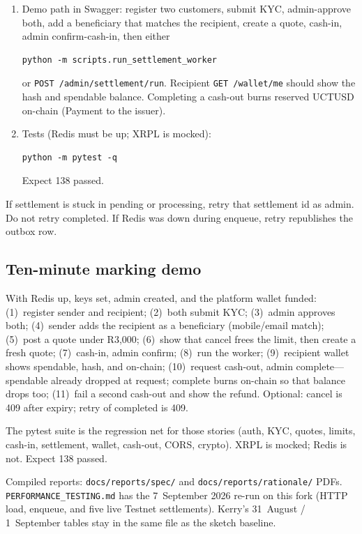 \documentclass[11pt]{article}
\begin{document}
\begin{enumerate}
  \item Demo path in Swagger: register two customers, submit KYC, admin-approve both, add a beneficiary that matches the recipient, create a quote, cash-in, admin confirm-cash-in, then either
\begin{verbatim}
python -m scripts.run_settlement_worker
\end{verbatim}
  or \texttt{POST /admin/settlement/run}. Recipient \texttt{GET /wallet/me} should show the hash and spendable balance. Completing a cash-out burns reserved UCTUSD on-chain (Payment to the issuer).
  \item Tests (Redis must be up; XRPL is mocked):
\begin{verbatim}
python -m pytest -q
\end{verbatim}
  Expect 138 passed.
\end{enumerate}

If settlement is stuck in pending or processing, retry that settlement id as admin. Do not retry completed. If Redis was down during enqueue, retry republishes the outbox row.

\subsection{Ten-minute marking demo}
With Redis up, keys set, admin created, and the platform wallet funded: (1)~register sender and recipient; (2)~both submit KYC; (3)~admin approves both; (4)~sender adds the recipient as a beneficiary (mobile/email match); (5)~post a quote under R3{,}000; (6)~show that cancel frees the limit, then create a fresh quote; (7)~cash-in, admin confirm; (8)~run the worker; (9)~recipient wallet shows spendable, hash, and on-chain; (10)~request cash-out, admin complete---spendable already dropped at request; complete burns on-chain so that balance drops too; (11)~fail a second cash-out and show the refund. Optional: cancel is 409 after expiry; retry of completed is 409.

The pytest suite is the regression net for those stories (auth, KYC, quotes, limits, cash-in, settlement, wallet, cash-out, CORS, crypto). XRPL is mocked; Redis is not. Expect 138 passed.

Compiled reports: \texttt{docs/reports/spec/} and \texttt{docs/reports/rationale/} PDFs. \texttt{PERFORMANCE\_TESTING.md} has the 7~September 2026 re-run on this fork (HTTP load, enqueue, and five live Testnet settlements). Kerry's 31~August / 1~September tables stay in the same file as the sketch baseline.



\end{document}
